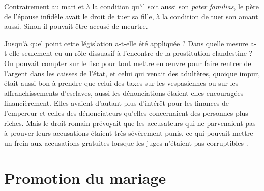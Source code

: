  Contrairement au mari et à la condition qu'il soit aussi son \emph{pater familias}, le père de l'épouse infidèle avait le droit de tuer sa fille, à la condition de tuer son amant aussi. Sinon il pouvait être accusé de meurtre.

 Jusqu'à quel point cette législation a-t-elle été appliquée ? Dans quelle mesure a-t-elle seulement eu un rôle dissuasif à l'encontre de la prostitution clandestine ? On pouvait compter sur le fisc pour tout mettre en œuvre pour faire rentrer de l'argent dans les caisses de l'état, et celui qui venait des adultères, quoique impur, était aussi bon à prendre que celui des taxes sur les vespasiennes ou sur les affranchissements d'esclaves, aussi les dénonciations étaient-elles encouragées financièrement. Elles avaient d'autant plus d'intérêt pour les finances de l'empereur et celles des dénonciateurs qu'elles concernaient des personnes plus riches. Mais le droit romain prévoyait que les accusateurs qui ne parvenaient pas à prouver leurs accusations étaient très sévèrement punis, ce qui pouvait mettre un frein aux accusations gratuites lorsque les juges n'étaient pas corruptibles . 

\section{Promotion du mariage}

